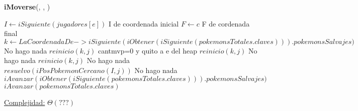 \begin{algorithm}[H]{\textbf{iMoverse}(, , )}
    \begin{algorithmic}[1]
        \State $I \gets iSiguiente(jugadores[e])$ \Comment I de coordenada inicial
        \State $F \gets c$  \Comment F de cordenada final
                    \State $k \gets LaCoordenadaDe->iSiguiente(iObtener(iSiguiente(pokemonsTotales.claves))).pokemonsSalvajes)$
                                \State \Comment No hago nada
                            \Else
                                \State $reinicio(k,j)$ \Comment cantmvp=0 y quito a e del heap
                            \EndIf
                        \Else
                            \State $reinicio(k,j)$
                        \EndIf
                    \EndIf
                \EndIf
                                \State \Comment No hago nada
                            \Else
                                \State $reinicio(k,j)$
                            \EndIf
                        \Else
                            \State \Comment No hago nada
                        \EndIf
                    \EndIf
                \EndIf
                        \State $resuelvo(iPosPokemonCercano(I,j))$
                    \Else
                        \State \Comment No hago nada
                    \EndIf
                \EndIf
                \State$iAvanzar(iObtener(iSiguiente(pokemonsTotales.claves))).pokemonsSalvajes)$
                \EndWhile
        \State $iAvanzar(pokemonsTotales.claves)$
        \EndWhile

		\Statex \underline{Complejidad:} $\Theta(???)$
    \end{algorithmic}
\end{algorithm}


